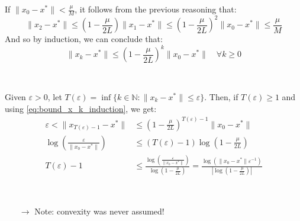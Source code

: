 \documentclass[12pt, openany]{report}
\theoremstyle{definition}
\begin{document}
If $\|x_0 - x^* \|< \frac{\mu}{M}$, it follows from the previous reasoning that:
\begin{equation}
	\|x_2 - x^*\| \leq  (1-\frac{\mu}{2L}) \|x_1-x^*\| \leq (1-\frac{\mu}{2L})^2 \|x_0-x^*\|\leq \frac{\mu}{M}
\end{equation} 
And so by induction, we can conclude that:
\begin{equation}\label{eq:bound_x_k_induction}
	\|x_k - x^*\| \leq \left(1-\frac{\mu}{2L}\right)^k \|x_0-x^*\| \quad \forall k \geq 0
\end{equation}
\begin{center}
	\color{red}\color{black}\\
\end{center}

Given $\varepsilon > 0$, let $T(\varepsilon) = \inf\{k\in \mathbb{N} : \|x_k -x^*\|\leq \varepsilon\}$. Then, if $T(\varepsilon) \geq 1$ and using \eqref{eq:bound_x_k_induction}, we get:
\begin{equation}
	\begin{aligned}
		\varepsilon < \|x_{T(\varepsilon)-1} - x^*\| &\leq \left(1-\frac{\mu}{2L}\right)^{T(\varepsilon)-1} \|x_0 - x^*\|\\
		\log \left(\frac{\varepsilon}{\|x_0 - x^*\|}\right) &\leq (T(\varepsilon)-1) \log \left(1-\frac{\mu}{2L}\right)\\
		T(\varepsilon)-1 &\leq \frac{\log \left(\frac{\varepsilon}{\|x_0 - x^*\|}\right)}{\log \left(1-\frac{\mu}{2L}\right)} = \frac{\log \left(\|x_0 - x^*\|\varepsilon^{-1}\right)}{|\log \left(1-\frac{\mu}{2L}\right)|}
	\end{aligned}
\end{equation}
\begin{center}
	\color{red}
	\color{black}\\
\end{center}
\begin{itemize}
	\item [$\rightarrow$] Note: convexity was never assumed!
\end{itemize}
\end{document}
